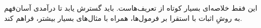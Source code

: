 \documentclass[../../../include/open-logic-chapter]{subfiles}
\begin{document}

\begin{editorial}
  این فقط خلاصه‌ای بسیار کوتاه از تعریف‌هاست. باید گسترش یابد تا درآمدی
  آسان‌فهم به روشِ اثبات با استقرا بر فرمول‌ها، همراه با مثال‌های بسیار
  بیشتر، فراهم کند.
\end{editorial}







\OLEndChapterHook
\end{document}
